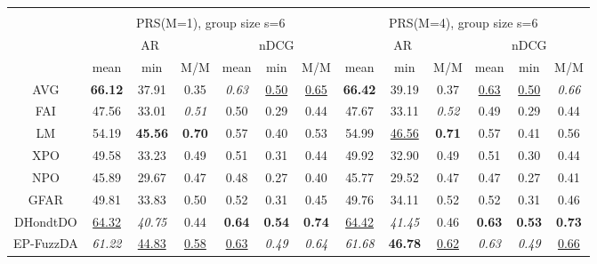 \begin{tabular}{ c | c c c | c c c || c c c | c c c}
\multicolumn{12}{c}{} \\
\multicolumn{1}{c}{} & \multicolumn{6}{c}{PRS(M=1), group size s=6} & \multicolumn{6}{c}{PRS(M=4), group size s=6} \\
\multicolumn{1}{c}{} & \multicolumn{3}{c}{AR} & \multicolumn{3}{c}{nDCG} & \multicolumn{3}{c}{AR} & \multicolumn{3}{c}{nDCG} \\
& mean & min & M/M & mean & min & M/M & mean & min & M/M & mean & min & M/M \\
\hline
AVG & \textbf{66.12} & 37.91 & 0.35 & \textit{0.63} & \underline{0.50} & \underline{0.65} & \textbf{66.42} & 39.19 & 0.37 & \underline{0.63} & \underline{0.50} & \textit{0.66} \\
FAI & 47.56 & 33.01 & \textit{0.51} & 0.50 & 0.29 & 0.44 & 47.67 & 33.11 & \textit{0.52} & 0.49 & 0.29 & 0.44 \\
LM & 54.19 & \textbf{45.56} & \textbf{0.70} & 0.57 & 0.40 & 0.53 & 54.99 & \underline{46.56} & \textbf{0.71} & 0.57 & 0.41 & 0.56 \\
XPO & 49.58 & 33.23 & 0.49 & 0.51 & 0.31 & 0.44 & 49.92 & 32.90 & 0.49 & 0.51 & 0.30 & 0.44 \\
NPO & 45.89 & 29.67 & 0.47 & 0.48 & 0.27 & 0.40 & 45.77 & 29.52 & 0.47 & 0.47 & 0.27 & 0.41 \\
GFAR & 49.81 & 33.83 & 0.50 & 0.52 & 0.31 & 0.45 & 49.76 & 34.11 & 0.52 & 0.52 & 0.31 & 0.46 \\
DHondtDO & \underline{64.32} & \textit{40.75} & 0.44 & \textbf{0.64} & \textbf{0.54} & \textbf{0.74} & \underline{64.42} & \textit{41.45} & 0.46 & \textbf{0.63} & \textbf{0.53} & \textbf{0.73} \\
EP-FuzzDA & \textit{61.22} & \underline{44.83} & \underline{0.58} & \underline{0.63} & \textit{0.49} & \textit{0.64} & \textit{61.68} & \textbf{46.78} & \underline{0.62} & \textit{0.63} & \textit{0.49} & \underline{0.66} \\


\end{tabular}
